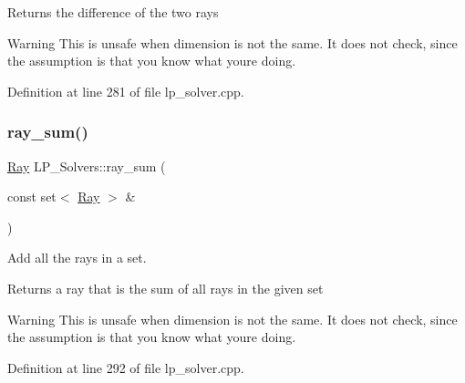 \begin{DoxyReturn}{Returns}
the difference of the two rays 
\end{DoxyReturn}
\begin{DoxyWarning}{Warning}
This is unsafe when dimension is not the same. It does not check, since the assumption is that you know what you\textquotesingle{}re doing. 
\end{DoxyWarning}


Definition at line 281 of file lp\+\_\+solver.\+cpp.

\mbox{\label{group___c_l_s_solvers_ga42f6aa14b6c3adb4df26f8338d486401}} 
\subsubsection{\texorpdfstring{ray\+\_\+sum()}{ray\_sum()}}
{\footnotesize\ttfamily \hyperlink{group___c_l_s_solvers_class_l_p___solvers_1_1_ray}{Ray} L\+P\+\_\+\+Solvers\+::ray\+\_\+sum (\begin{DoxyParamCaption}\item[{const set$<$ \hyperlink{group___c_l_s_solvers_class_l_p___solvers_1_1_ray}{Ray} $>$ \&}]{ }\end{DoxyParamCaption})}



Add all the rays in a set. 

\begin{DoxyReturn}{Returns}
a ray that is the sum of all rays in the given set 
\end{DoxyReturn}
\begin{DoxyWarning}{Warning}
This is unsafe when dimension is not the same. It does not check, since the assumption is that you know what you\textquotesingle{}re doing. 
\end{DoxyWarning}


Definition at line 292 of file lp\+\_\+solver.\+cpp.

\mbox{\label{group___c_l_s_solvers_ga8b57096f9dac0f00912dd248cfdc89db}} 

